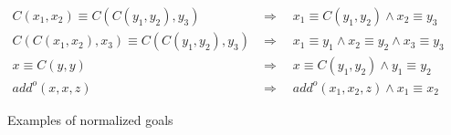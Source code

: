\begin{figure*}[t!]
  \centering
  \begin{minipage}{0.8\textwidth}
\[
    \begin{array}{rl}
        C\left( x_1, x_2 \right) \equiv C\left( C\left( y_1, y_2 \right), y_3 \right) & \Rightarrow \quad x_1 \equiv C\left( y_1, y_2 \right) \land x_2 \equiv y_3               \\
        C\left( C\left( x_1, x_2 \right), x_3 \right) \equiv C\left( C\left( y_1, y_2 \right), y_3 \right) & \Rightarrow \quad x_1 \equiv y_1 \land x_2 \equiv y_2 \land x_3 \equiv y_3               \\
        x \equiv C \left(y, y \right)                 & \Rightarrow \quad x \equiv C \left(y_1, y_2\right) \land y_1 \equiv y_2                  \\
        add^o\left( x, x, z \right)                   & \Rightarrow \quad add^o\left( x_1, x_2, z \right) \land x_1 \equiv x_2
    \end{array}
\]
  \end{minipage}
  \caption{Examples of normalized goals}
  \label{fig:superhomo}
\end{figure*}



